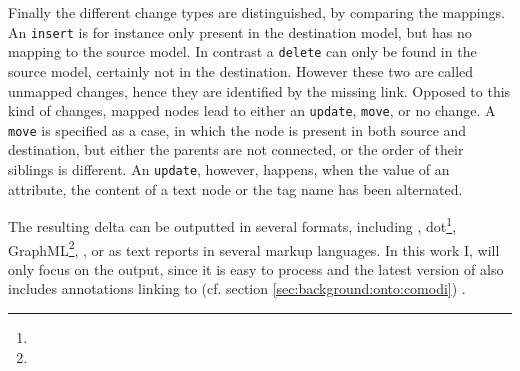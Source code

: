 	Finally the different change types are distinguished, by comparing the mappings. An \texttt{insert} is for instance only present in the destination model, but has no mapping to the source model. In contrast a \texttt{delete} can only be found in the source model, certainly not in the destination.
	However these two are called unmapped changes, hence they are identified by the missing link. Opposed to this kind of changes, mapped nodes lead to either an \texttt{update}, \texttt{move}, or no change.
	A \texttt{move} is specified as a case, in which the node is present in both source and destination, but either the parents are not connected, or the order of their siblings is different. An \texttt{update}, however, happens, when the value of an attribute, the content of a text node or the tag name has been alternated.
	
	The resulting \xml delta can be outputted in several formats, including \xml, dot\footnote{}, GraphML\footnote{\todo{}}, \json, or as text reports in several markup languages.
	In this work I, will only focus on the \xml output, since it is easy to process and the latest version of \bives also includes \rdf annotations linking to \comodi (cf. section \ref{sec:background:onto:comodi}) \citep{Scharm2015}.
	
